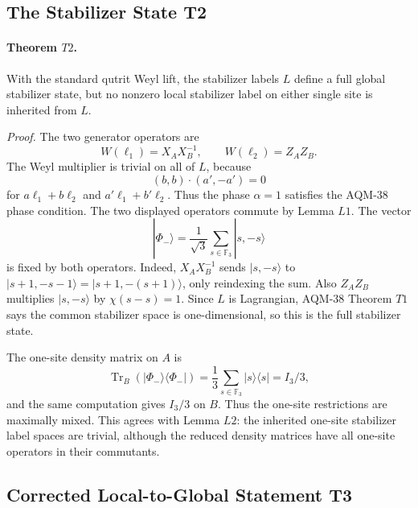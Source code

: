 \subsection{The Stabilizer State T2}

\paragraph{Theorem \(T2\).}
With the standard qutrit Weyl lift, the stabilizer labels \(L\) define a full
global stabilizer state, but no nonzero local stabilizer label on either
single site is inherited from \(L\).

\emph{Proof.}
The two generator operators are
\[
  W(\ell_1)=X_AX_B^{-1},\qquad W(\ell_2)=Z_AZ_B .
\]
The Weyl multiplier is trivial on all of \(L\), because
\[
  (b,b)\cdot(a',-a')=0
\]
for \(a\ell_1+b\ell_2\) and \(a'\ell_1+b'\ell_2\).  Thus the phase
\(\alpha=1\) satisfies the AQM-38 phase condition.  The two displayed
operators commute by Lemma \(L1\).  The vector
\[
  |\Phi_-\rangle=\frac1{\sqrt3}\sum_{s\in\mathbb F_3}|s,-s\rangle
\]
is fixed by both operators.  Indeed, \(X_AX_B^{-1}\) sends
\(|s,-s\rangle\) to \(|s+1,-s-1\rangle=|s+1,-(s+1)\rangle\), only
reindexing the sum.  Also \(Z_AZ_B\) multiplies \(|s,-s\rangle\) by
\(\chi(s-s)=1\).  Since \(L\) is Lagrangian, AQM-38 Theorem \(T1\) says the
common stabilizer space is one-dimensional, so this is the full stabilizer
state.

The one-site density matrix on \(A\) is
\[
  \operatorname{Tr}_B(|\Phi_-\rangle\langle\Phi_-|)
  =
  \frac13\sum_{s\in\mathbb F_3}|s\rangle\langle s|
  =
  I_3/3,
\]
and the same computation gives \(I_3/3\) on \(B\).  Thus the one-site
restrictions are maximally mixed.  This agrees with Lemma \(L2\): the inherited
one-site stabilizer label spaces are trivial, although the reduced density
matrices have all one-site operators in their commutants.

\subsection{Corrected Local-to-Global Statement T3}

